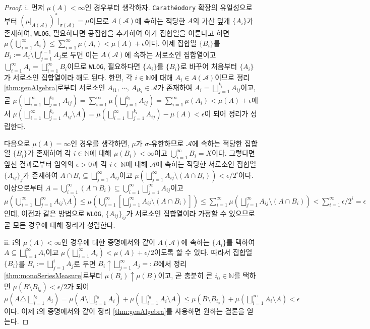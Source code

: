 \begin{proof}
    i. 먼저 $\mu(A)<\infty$인 경우부터 생각하자. \texttt{Carath\'eodory} 확장의 유일성으로부터 $(\mu\vert_{A(\mathcal{A})})^*\vert_{\sigma(\mathcal{A})}=\mu$이므로 $A(\mathcal{A})$에 속하는 적당한 $A$의 가산 덮개 $\{A_i\}$가 존재하여, \texttt{WLOG}, 필요하다면 공집합을 추가하여 이가 집합열을 이룬다고 하면 $\mu(\bigcup_{i=1}^\infty A_i)\leq\sum_{i=1}^\infty\mu(A_i)<\mu(A)+\epsilon$이다. 이제 집합열 $\{B_i\}$를 $B_i:=A_i\setminus\bigcup_{j=1}^{i-1}A_j$로 두면 이는 $A(\mathcal{A})$에 속하는 서로소인 집합열이고 $\bigcup_{i=1}^\infty A_i=\bigsqcup_{i=1}^\infty B_i$이므로 \texttt{WLOG}, 필요하다면 $\{A_i\}$를 $\{B_i\}$로 바꾸어 처음부터 $\{A_i\}$가 서로소인 집합열이라 해도 된다. 한편, 각 $i\in\mathbb{N}$에 대해 $A_i\in A(\mathcal{A})$이므로 정리 \ref{thm:genAlgebra}로부터 서로소인 $A_{i1},\,\cdots,\,A_{ik_i}\in\mathcal{A}$가 존재하여 $A_i=\bigsqcup_{j=1}^{k_i}A_{ij}$이고, 곧 $\mu(\bigsqcup_{i=1}^\infty\bigsqcup_{j=1}^{k_i}A_{ij})=\sum_{i=1}^\infty\mu(\bigsqcup_{j=1}^{k_i}A_{ij})=\sum_{i=1}^\infty\mu(A_i)<\mu(A)+\epsilon$에서 $\mu(\bigsqcup_{i=1}^\infty\bigsqcup_{j=1}^{k_i}A_{ij}\setminus A)=\mu(\bigsqcup_{i=1}^\infty\bigsqcup_{j=1}^{k_i}A_{ij})-\mu(A)<\epsilon$이 되어 정리가 성립한다.

    다음으로 $\mu(A)=\infty$인 경우를 생각하면, $\mu$가 $\sigma$-유한하므로 $\mathcal{A}$에 속하는 적당한 집합열 $\{B_i\}$가 존재하여 각 $i\in\mathbb{N}$에 대해 $\mu(B_i)<\infty$이고 $\bigcup_{i=1}^\infty B_i=X$이다. 그렇다면 앞선 결과로부터 임의의 $\epsilon>0$과 각 $i\in\mathbb{N}$에 대해 $\mathcal{A}$에 속하는 적당한 서로소인 집합열 $\{A_{ij}\}_j$가 존재하여 $A\cap B_i\subseteq\bigsqcup_{j=1}^\infty A_{ij}$이고 $\mu(\bigsqcup_{j=1}^\infty A_{ij}\setminus(A\cap B_i))<\epsilon/2^i$이다. 이상으로부터 $A=\bigcup_{i=1}^\infty(A\cap B_i)\subseteq\bigcup_{i=1}^\infty\bigsqcup_{j=1}^\infty A_{ij}$이고 $\mu(\bigcup_{i=1}^\infty\bigsqcup_{j=1}^\infty A_{ij}\setminus A)\leq\mu(\bigcup_{i=1}^\infty[\bigsqcup_{j=1}^\infty A_{ij}\setminus(A\cap B_i)])\leq\sum_{i=1}^\infty\mu(\bigsqcup_{j=1}^\infty A_{ij}\setminus(A\cap B_i))<\sum_{i=1}^\infty\epsilon/2^i=\epsilon$인데, 이전과 같은 방법으로 \texttt{WLOG}, $\{A_{ij}\}_{ij}$가 서로소인 집합열이라 가정할 수 있으므로 곧 모든 경우에 대해 정리가 성립한다.

    ii. i의 $\mu(A)<\infty$인 경우에 대한 증명에서와 같이 $A(\mathcal{A})$에 속하는 $\{A_i\}$를 택하여 $A\subseteq\bigsqcup_{i=1}^\infty A_i$이고 $\mu(\bigsqcup_{i=1}^\infty A_i)<\mu(A)+\epsilon/2$이도록 할 수 있다. 따라서 집합열 $\{B_i\}$를 $B_i:=\bigsqcup_{j=1}^iA_j$로 두면 $B_i\uparrow\bigsqcup_{j=1}^\infty A_j=:B$에서 정리 \ref{thm:monoSeriesMeasure}로부터 $\mu(B_i)\uparrow\mu(B)$이고, 곧 충분히 큰 $i_0\in\mathbb{N}$를 택하면 $\mu(B\setminus B_{i_0})<\epsilon/2$가 되어 $\mu(A\triangle\bigsqcup_{i=1}^{i_0}A_i)=\mu(A\setminus\bigsqcup_{i=1}^{i_0}A_i)+\mu(\bigsqcup_{i=1}^{i_0}A_i\setminus A)\leq\mu(B\setminus B_{i_0})+\mu(\bigsqcup_{i=1}^\infty A_i\setminus A)<\epsilon$이다. 이제 i의 증명에서와 같이 정리 \ref{thm:genAlgebra}를 사용하면 원하는 결론을 얻는다.
\end{proof}

